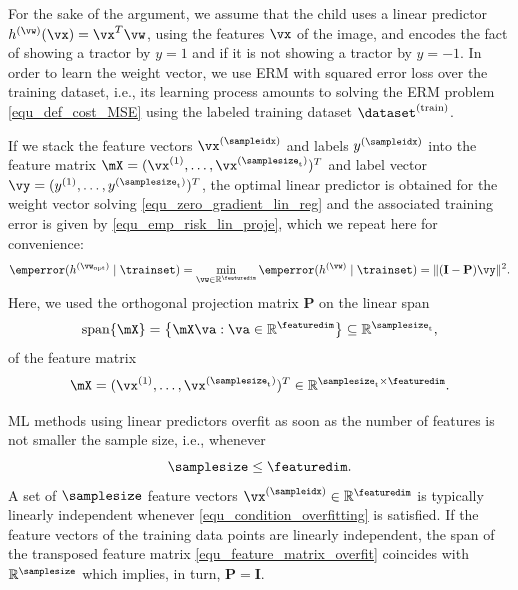 \documentclass[12pt]{report}
\begin{document}
For the sake of the argument, we assume that the child uses a linear predictor 
$h^{(\vw)}(\vx) = \vx^{T} \vw$, using the features $\vx$ of the image, and encodes 
the fact of showing a tractor by $y=1$ and if it is not showing a tractor by $y=-1$. 
In order to learn the weight vector, we use ERM with squared error loss over the 
training dataset, i.e., its learning process amounts to solving the ERM problem 
\eqref{equ_def_cost_MSE} using the labeled training dataset $ \dataset^{(\rm train)}$. 

If we stack the feature vectors $\vx^{(\sampleidx)}$ and labels $y^{(\sampleidx)}$ into 
the feature matrix $\mX=(\vx^{(1)},\ldots,\vx^{(\samplesize_{\rm t})})^{T}$ and label 
vector $\vy=(y^{(1)},\ldots,y^{(\samplesize_{\rm t})})^{T}$, the optimal linear predictor 
is obtained for the weight vector solving \eqref{equ_zero_gradient_lin_reg} 
and the associated training error is given by \eqref{equ_emp_risk_lin_proje}, which 
we repeat here for convenience: 
\begin{equation}
\emperror(h^{(\vw_{\rm opt})} \mid \trainset) = \min_{\vw \in \mathbb{R}^{\featuredim}} \emperror(h^{(\vw)} \mid \trainset) = \|  (\mathbf{I}- \mathbf{P}) \vy \|^{2}.
\end{equation} 
Here, we used the orthogonal projection matrix $\mathbf{P}$ on the linear span 
\begin{equation} 
\nonumber
{\rm span}\{ \mX \} = \big\{  \mX \va : \va \in \mathbb{R}^{\featuredim} \big\} \subseteq \mathbb{R}^{\samplesize_{\rm t}} , 
\end{equation}
of the feature matrix 
\begin{equation} 
\label{equ_feature_matrix_overfit}
\mX = (\vx^{(1)},\ldots,\vx^{(\samplesize_{\rm t})})^{T} \in \mathbb{R}^{  \samplesize_{\rm t} \times \featuredim}. 
\end{equation} 

ML methods using linear predictors overfit as soon as the 
number of features is not smaller the sample size, i.e., whenever 
\begin{equation} 
\label{equ_condition_overfitting}
\samplesize \leq \featuredim. 
\end{equation} 
A set of $\samplesize$ feature vectors $\vx^{(\sampleidx)} \in \mathbb{R}^{\featuredim}$ 
is typically linearly independent whenever \eqref{equ_condition_overfitting} is satisfied. 
If the feature vectors of the training data points are linearly independent, 
the span of the transposed feature matrix \eqref{equ_feature_matrix_overfit} 
coincides with $\mathbb{R}^{\samplesize}$ which implies, in turn, $\mathbf{P} = \mathbf{I}$. 
\end{document}
